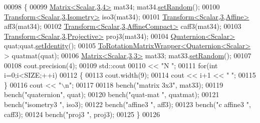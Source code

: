 \begin{DoxyCode}
00098 \{
00099   \hyperlink{group___core___module_class_eigen_1_1_matrix}{Matrix<Scalar,3,4>} mat34; mat34.\hyperlink{class_eigen_1_1_plain_object_base_af0e576a0e1aefc9ee346de44cc352ba3}{setRandom}();
00100   \hyperlink{group___geometry___module_class_eigen_1_1_transform}{Transform<Scalar,3,Isometry>} iso3(mat34);
00101   \hyperlink{group___geometry___module_class_eigen_1_1_transform}{Transform<Scalar,3,Affine>} aff3(mat34);
00102   \hyperlink{group___geometry___module_class_eigen_1_1_transform}{Transform<Scalar,3,AffineCompact>} caff3(mat34);
00103   \hyperlink{group___geometry___module_class_eigen_1_1_transform}{Transform<Scalar,3,Projective>} proj3(mat34);
00104   \hyperlink{group___geometry___module_class_eigen_1_1_quaternion}{Quaternion<Scalar>} quat;quat.\hyperlink{group___geometry___module_a113a5ffea680c7427dc1144d7c66efe9}{setIdentity}();
00105   \hyperlink{struct_to_rotation_matrix_wrapper}{ToRotationMatrixWrapper<Quaternion<Scalar>} > quatmat(quat);
00106   \hyperlink{group___core___module_class_eigen_1_1_matrix}{Matrix<Scalar,3,3>} mat33; mat33.\hyperlink{class_eigen_1_1_plain_object_base_af0e576a0e1aefc9ee346de44cc352ba3}{setRandom}();
00107   
00108   cout.precision(4);
00109   std::cout
00110      << \textcolor{stringliteral}{"N          "};
00111   \textcolor{keywordflow}{for}(\textcolor{keywordtype}{int} i=0;i<SIZE;++i)
00112   \{
00113     cout.width(9);
00114     cout << i+1 << \textcolor{stringliteral}{" "};
00115   \}
00116   cout << \textcolor{stringliteral}{"\(\backslash\)n"};
00117   
00118   bench(\textcolor{stringliteral}{"matrix 3x3"}, mat33);
00119   bench(\textcolor{stringliteral}{"quaternion"}, quat);
00120   bench(\textcolor{stringliteral}{"quat-mat  "}, quatmat);
00121   bench(\textcolor{stringliteral}{"isometry3 "}, iso3);
00122   bench(\textcolor{stringliteral}{"affine3   "}, aff3);
00123   bench(\textcolor{stringliteral}{"c affine3 "}, caff3);
00124   bench(\textcolor{stringliteral}{"proj3     "}, proj3);
00125 \}
00126 
\end{DoxyCode}
